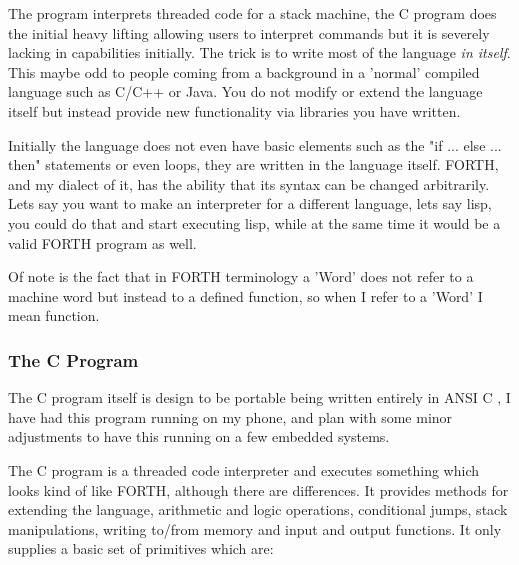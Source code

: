 \documentclass	[a4paper, 10pt]	{article}
\begin{document}
    The program interprets threaded code \cite{threadedCode} for a stack machine,
    the C program does the initial heavy lifting allowing users to interpret commands
    but it is severely lacking in capabilities initially. The trick is to write most
    of the language \emph{in itself}. This maybe odd to people coming from a background
    in a 'normal' compiled language such as C/C++ or Java. You do not modify or extend
    the language itself but instead provide new functionality via libraries you have
    written.

    Initially the language does not even have basic elements such as the "if ... else ... then"
    statements or even loops, they are written in the language itself. FORTH, and my
    dialect of it, has the ability that its syntax can be changed arbitrarily. Lets say
    you want to make an interpreter for a different language, lets say lisp, you could
    do that and start executing lisp, while at the same time it would be a valid FORTH
    program as well.

    Of note is the fact that in FORTH terminology a 'Word' does not refer to a machine
    word but instead to a defined function, so when I refer to a 'Word' I mean function.

      \subsubsection{The C Program}

      The C program itself is design to be portable being written entirely in ANSI C \cite{ANSIC}, 
      I have had this program running on my phone, and plan with some minor adjustments
      to have this running on a few embedded systems.

      The C program is a threaded code interpreter and executes something which looks
      kind of like FORTH, although there are differences. It provides methods for
      extending the language, arithmetic and logic operations, conditional jumps,
      stack manipulations, writing to/from memory and input and output functions. It
      only supplies a basic set of primitives which are:
\end{document}
